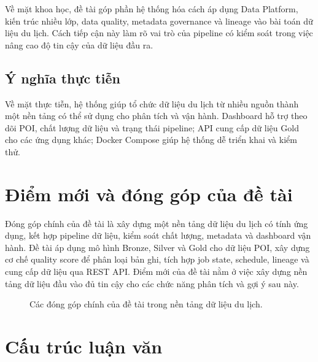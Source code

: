 \documentclass[12pt,a4paper]{article}
\begin{document}
Về mặt khoa học, đề tài góp phần hệ thống hóa cách áp dụng Data Platform, kiến trúc nhiều lớp, data quality, metadata governance và lineage vào bài toán dữ liệu du lịch. Cách tiếp cận này làm rõ vai trò của pipeline có kiểm soát trong việc nâng cao độ tin cậy của dữ liệu đầu ra.

\subsection{Ý nghĩa thực tiễn}

Về mặt thực tiễn, hệ thống giúp tổ chức dữ liệu du lịch từ nhiều nguồn thành một nền tảng có thể sử dụng cho phân tích và vận hành. Dashboard hỗ trợ theo dõi POI, chất lượng dữ liệu và trạng thái pipeline; API cung cấp dữ liệu Gold cho các ứng dụng khác; Docker Compose giúp hệ thống dễ triển khai và kiểm thử.

\section{Điểm mới và đóng góp của đề tài}

Đóng góp chính của đề tài là xây dựng một nền tảng dữ liệu du lịch có tính ứng dụng, kết hợp pipeline dữ liệu, kiểm soát chất lượng, metadata và dashboard vận hành. Đề tài áp dụng mô hình Bronze, Silver và Gold cho dữ liệu POI, xây dựng cơ chế quality score để phân loại bản ghi, tích hợp job state, schedule, lineage và cung cấp dữ liệu qua REST API. Điểm mới của đề tài nằm ở việc xây dựng nền tảng dữ liệu đầu vào đủ tin cậy cho các chức năng phân tích và gợi ý sau này.

\begin{figure}[htbp]
\centering
{}
\caption{Các đóng góp chính của đề tài trong nền tảng dữ liệu du lịch.}
\end{figure}

\section{Cấu trúc luận văn}
\end{document}
